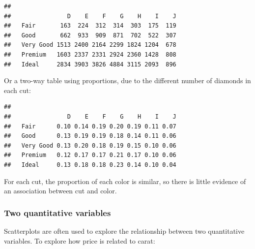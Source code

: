 \documentclass[
]{book}
\newenvironment{Shaded}{\begin{snugshade}}{\end{snugshade}}
\newcommand{\AttributeTok}[1]{\textcolor[rgb]{0.13,0.29,0.53}{#1}}
\newcommand{\DecValTok}[1]{\textcolor[rgb]{0.00,0.00,0.81}{#1}}
\newcommand{\FunctionTok}[1]{\textcolor[rgb]{0.13,0.29,0.53}{\textbf{#1}}}
\newcommand{\NormalTok}[1]{#1}
\newcommand{\SpecialCharTok}[1]{\textcolor[rgb]{0.81,0.36,0.00}{\textbf{#1}}}
\theoremstyle{definition}
\theoremstyle{definition}
\theoremstyle{definition}
\theoremstyle{definition}
\theoremstyle{remark}
\begin{document}
\begin{Shaded}
\end{Shaded}

\begin{verbatim}
##            
##                D    E    F    G    H    I    J
##   Fair       163  224  312  314  303  175  119
##   Good       662  933  909  871  702  522  307
##   Very Good 1513 2400 2164 2299 1824 1204  678
##   Premium   1603 2337 2331 2924 2360 1428  808
##   Ideal     2834 3903 3826 4884 3115 2093  896
\end{verbatim}

Or a two-way table using proportions, due to the different number of diamonds in each cut:

\begin{Shaded}
\end{Shaded}

\begin{verbatim}
##            
##                D    E    F    G    H    I    J
##   Fair      0.10 0.14 0.19 0.20 0.19 0.11 0.07
##   Good      0.13 0.19 0.19 0.18 0.14 0.11 0.06
##   Very Good 0.13 0.20 0.18 0.19 0.15 0.10 0.06
##   Premium   0.12 0.17 0.17 0.21 0.17 0.10 0.06
##   Ideal     0.13 0.18 0.18 0.23 0.14 0.10 0.04
\end{verbatim}

For each cut, the proportion of each color is similar, so there is little evidence of an association between cut and color.

\hypertarget{two-quantitative-variables}{%
\subsubsection{Two quantitative variables}\label{two-quantitative-variables}}

Scatterplots are often used to explore the relationship between two quantitative variables. To explore how price is related to carat:
\end{document}
